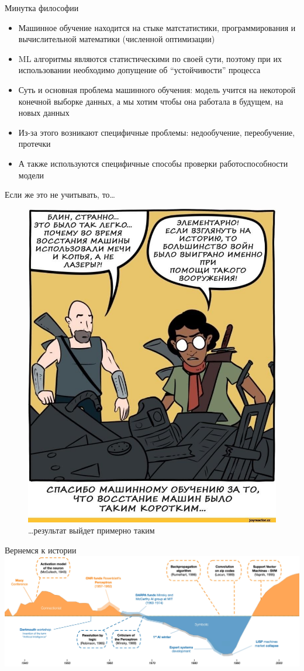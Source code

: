 \documentclass[aspectratio=169]{beamer}
\begin{document}
\begin{frame}{Минутка философии}
    \begin{itemize}
        \item Машинное обучение находится на стыке матстатистики, программирования и
        вычислительной математики (численной оптимизации)
        \pause{}
        \item ML алгоритмы являются статистическими по своей сути, поэтому при их
        использовании необходимо допущение об ``устойчивости'' процесса
        \pause{}
        \item Суть и основная проблема машинного обучения: модель учится на некоторой
        конечной выборке данных, а мы хотим чтобы она работала в будущем, на
        новых данных
        \pause{}
        \item Из-за этого возникают специфичные проблемы: недообучение,
        переобучение, протечки
        \pause{}
        \item А также используются специфичные способы проверки работоспособности модели
    \end{itemize}
\end{frame}

\begin{frame}{Если же это не учитывать, то\ldots}
    \begin{figure}
        \caption*{\ldots результат выйдет примерно таким}
        \includegraphics[width=.3\linewidth]{graphs/fig18.jpg}
    \end{figure}
\end{frame}

\begin{frame}{Вернемся к истории}
    \includegraphics[width=\linewidth]{graphs/fig2.jpg}
\end{frame}
\end{document}
